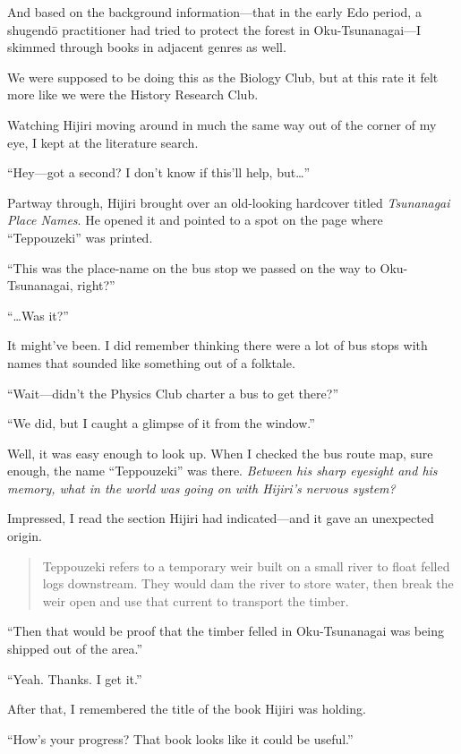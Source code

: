\documentclass[
    a4paper,
    12pt,
    twoside,
    openany,
    UTF8,
    fontset=windows
]{ctexbook}
\begin{document}
And based on the background information---that in the early Edo period, a shugend\=o practitioner had tried to protect the forest in Oku-Tsunanagai---I skimmed through books in adjacent genres as well.

We were supposed to be doing this as the Biology Club, but at this rate it felt more like we were the History Research Club.

Watching Hijiri moving around in much the same way out of the corner of my eye, I kept at the literature search.

``Hey---got a second? I don't know if this'll help, but\dots''

Partway through, Hijiri brought over an old-looking hardcover titled \textit{Tsunanagai Place Names}. He opened it and pointed to a spot on the page where ``Teppouzeki'' was printed.

``This was the place-name on the bus stop we passed on the way to Oku-Tsunanagai, right?''

``\dots Was it?''

It might've been. I did remember thinking there were a lot of bus stops with names that sounded like something out of a folktale.

``Wait---didn't the Physics Club charter a bus to get there?''

``We did, but I caught a glimpse of it from the window.''

Well, it was easy enough to look up. When I checked the bus route map, sure enough, the name ``Teppouzeki'' was there. \textit{Between his sharp eyesight and his memory, what in the world was going on with Hijiri's nervous system?}

Impressed, I read the section Hijiri had indicated---and it gave an unexpected origin.

{\bfseries
\begin{quote}
Teppouzeki refers to a temporary weir built on a small river to float felled logs downstream. They would dam the river to store water, then break the weir open and use that current to transport the timber.
\end{quote}
}

``Then that would be proof that the timber felled in Oku-Tsunanagai was being shipped out of the area.''

``Yeah. Thanks. I get it.''

After that, I remembered the title of the book Hijiri was holding.

``How's your progress? That book looks like it could be useful.''
\end{document}
